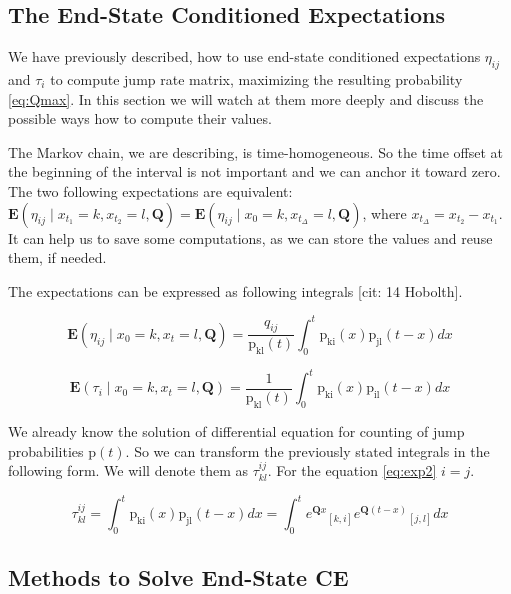\documentclass[thesis=M,english]{FITthesis}[2012/10/20]
\newcommand{\matr}[1]{\mathbf{#1}}
\begin{document}
\subsection{The End-State Conditioned Expectations}\label{sec:endexp}

We have previously described, how to use end-state conditioned expectations $\eta_{ij}$ and $\tau_i$ to compute jump rate matrix, maximizing the resulting probability \eqref{eq:Qmax}. In this section we will watch at them more deeply and discuss the possible ways how to compute their values.

The Markov chain, we are describing, is time-homogeneous. So the time offset at the beginning of the interval is not important and we can anchor it toward zero. The two following expectations are equivalent: $\mathbf{E}(\eta_{ij} \mid x_{t_1} = k, x_{t_2} = l, \matr{ Q } ) = \mathbf{E}(\eta_{ij} \mid x_0 = k, x_{t_\Delta} = l, \matr{ Q } )$, where $x_{t_\Delta} = x_{t_2} - x_{t_1}$. It can help us to save some computations, as we can store the values and reuse them, if needed.

The expectations can be expressed as following integrals [cit: 14 Hobolth].   

\begin{equation}\label{eq:exp1}
\mathbf{E}(\eta_{ij} \mid x_0 = k, x_t = l, \matr{ Q } ) = \frac{ q_{ij} }{ \mathrm{p_{kl}}(t) } 
\int_{0}^{t} \mathrm{p_{ki}}(x) \mathrm{p_{jl}}(t-x) dx
\end{equation}

\begin{equation}\label{eq:exp2}
\mathbf{E}( \tau_i \mid x_0 = k, x_t = l, \matr{ Q } ) = \frac{ 1 }{ \mathrm{p_{kl}}(t) } 
\int_{0}^{t} \mathrm{p_{ki}}(x) \mathrm{p_{il}}(t-x) dx
\end{equation}

We already know the solution of differential equation for counting of jump probabilities $\mathrm{p}(t)$. So we can transform the previously stated integrals in the following form. We will denote them as $\tau^{ij}_{kl}$. For the equation \eqref{eq:exp2} $i = j$. 

\begin{equation}\label{eq:int}
\tau^{ij}_{kl} = \int_{0}^{t} \mathrm{p_{ki}}(x) \mathrm{p_{jl}}(t-x) dx = 
\int_{0}^{t} {e^{\matr{Q}x}}_{[k,i]} {e^{\matr{Q}(t-x)}}_{[j,l]} dx
\end{equation} 

\subsection{Methods to Solve End-State CE }
\end{document}
